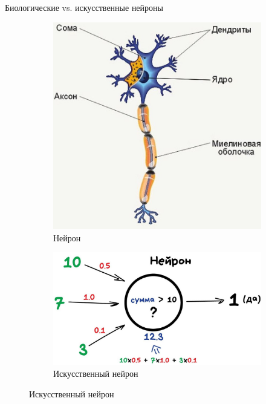 \documentclass[aspectratio=169]{beamer}
\begin{document}
\begin{frame}{Биологические vs. искусственные нейроны}
    \begin{figure}
        \begin{subfigure}[b]{.35\linewidth}
            \centering
            \includegraphics[width=\linewidth]{figures/fig9.jpg}
            \caption*{Нейрон}
        \end{subfigure}
        \begin{subfigure}[b]{.64\linewidth}
            \centering
            \includegraphics[width=\linewidth]{figures/fig10.jpg}
            \caption*{Искусственный нейрон}
        \end{subfigure}
    \end{figure}
\end{frame}
\end{document}
